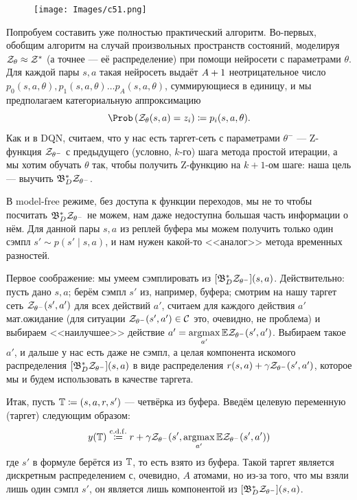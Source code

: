 \begin{figure}
\vspace{-0.5cm}
\centering
\texttt{[image: Images/c51.png]}
\vspace{-0.5cm}
\end{figure}
Попробуем составить уже полностью практический алгоритм. Во-первых, обобщим алгоритм на случай произвольных пространств состояний, моделируя $\Z_\theta \HM\approx \Z^*$ (а точнее --- её распределение) при помощи нейросети с параметрами $\theta$. Для каждой пары $s, a$ такая нейросеть выдаёт $A \HM+ 1$ неотрицательное число $p_0(s, a, \theta), p_1(s, a, \theta) \dots p_A(s, a, \theta)$, суммирующиеся в единицу, и мы предполагаем категориальную аппроксимацию
\begin{equation}\label{neural_categorical}
\Prob \left( \Z_{\theta}(s, a) = z_i \right) \coloneqq p_i(s, a, \theta).
\end{equation}
Как и в DQN, считаем, что у нас есть таргет-сеть с параметрами $\theta^{-}$ --- Z-функция $\mathcal{Z}_{\theta^-}$ с предыдущего (условно, $k$-го) шага метода простой итерации, а мы хотим обучать $\theta$ так, чтобы получить Z-функцию на $k+1$-ом шаге: наша цель --- выучить $\mathfrak{B}^*_D \mathcal{Z}_{\theta^-}$. 

В model-free режиме, без доступа к функции переходов, мы не то чтобы посчитать $\mathfrak{B}^*_D \mathcal{Z}_{\theta^-}$ не можем, нам даже недоступна большая часть информации о нём. Для данной пары $s, a$ из реплей буфера мы можем получить только один сэмпл $s' \sim p(s' \mid s, a)$, и нам нужен какой-то <<аналог>> метода временных разностей.

Первое соображение: мы умеем сэмплировать из $[\mathfrak{B}^*_D \mathcal{Z}_{\theta^-}](s, a)$. Действительно: пусть дано $s, a$; берём сэмпл $s'$ из, например, буфера; смотрим на нашу таргет сеть $\mathcal{Z}_{\theta^-}(s', a')$ для всех действий $a'$, считаем для каждого действия $a'$ мат.ожидание (для ситуации $\Z_{\theta^-}(s', a') \HM\in \mathcal{C}$ это, очевидно, не проблема) и выбираем <<наилучшее>> действие $a' \HM= \argmax\limits_{a'} \E \Z_{\theta^-}(s', a')$. Выбираем такое $a'$, и дальше у нас есть даже не сэмпл, а целая компонента искомого распределения $[\mathfrak{B}^*_D \mathcal{Z}_{\theta^-}](s, a)$ в виде распределения $r(s, a) + \gamma \mathcal{Z}_{\theta^-}(s', a')$, которое мы и будем использовать в качестве таргета. 

Итак, пусть $\mathbb{T} \coloneqq (s, a, r, s')$ --- четвёрка из буфера. Введём целевую переменную (таргет) следующим образом:
\begin{equation}\label{distributionaltarget}
y(\mathbb{T}) \mathrel{\stackrel{\mathrm{c.d.f.}}\coloneqq} r + \gamma \mathcal{Z}_{\theta^{-}}(s', \mathop{\mathrm{argmax}}_{a'} \mathbb{E} \mathcal{Z}_{\theta^{-}}(s', a'))
\end{equation}
где $s'$ в формуле берётся из $\mathbb{T}$, то есть взято из буфера. Такой таргет является дискретным распределением с, очевидно, $A$ атомами, но из-за того, что мы взяли лишь один сэмпл $s'$, он является лишь компонентой из $[\mathfrak{B}^*_D \mathcal{Z}_{\theta^-}](s, a)$.

